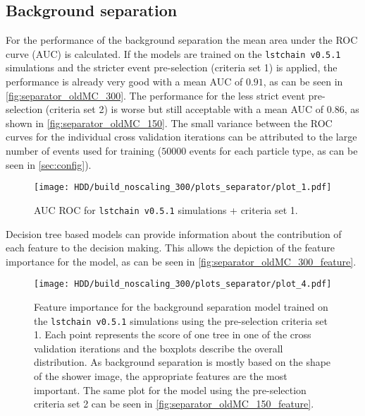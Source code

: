 \subsection{Background separation}
For the performance of the background separation the mean area under the ROC curve (AUC) is calculated.%
If the models are trained on the \texttt{lstchain v0.5.1} simulations and the stricter event pre-selection (criteria set 1) is applied,
the performance is already very good with a mean AUC of $\num{0.91}$, as can be seen in \autoref{fig:separator_oldMC_300}.
The performance for the less strict event pre-selection (criteria set 2) is worse but still acceptable with a mean AUC of $\num{0.86}$, as shown in
\autoref{fig:separator_oldMC_150}. The small variance between the ROC curves for the individual cross validation iterations 
can be attributed to the large number of events used for training ($\num{50000}$ events for each particle type, as can be seen in \autoref{sec:config}). 
\begin{figure}
    \centering
    \texttt{[image: HDD/build\_noscaling\_300/plots\_separator/plot\_1.pdf]}
    \caption{AUC ROC for \texttt{lstchain v0.5.1} simulations + criteria set 1.}
    \label{fig:separator_oldMC_300}
\end{figure}

Decision tree based models can provide information about the contribution of each feature to the decision making.
This allows the depiction of the feature importance for the model, as can be seen in \autoref{fig:separator_oldMC_300_feature}.
\begin{figure}
    \centering
    \texttt{[image: HDD/build\_noscaling\_300/plots\_separator/plot\_4.pdf]}
    \caption{Feature importance for the background separation model trained on the \texttt{lstchain v0.5.1} simulations using the pre-selection criteria set 1.
        Each point represents the score of one tree in one of the cross validation iterations and the boxplots describe the overall distribution.
        As background separation is mostly based on the shape of the shower image, the appropriate features are the most important.
        The same plot for the model using the pre-selection criteria set 2 can be seen in \autoref{fig:separator_oldMC_150_feature}.
    }
    \label{fig:separator_oldMC_300_feature}
\end{figure}

